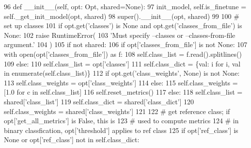\begin{DoxyCode}
96     \textcolor{keyword}{def }\_\_init\_\_(self, opt: Opt, shared=\textcolor{keywordtype}{None}):
97         init\_model, self.is\_finetune = self.\_get\_init\_model(opt, shared)
98         super().\_\_init\_\_(opt, shared)
99 
100         \textcolor{comment}{# set up classes}
101         \textcolor{keywordflow}{if} opt.get(\textcolor{stringliteral}{'classes'}) \textcolor{keywordflow}{is} \textcolor{keywordtype}{None} \textcolor{keywordflow}{and} opt.get(\textcolor{stringliteral}{'classes\_from\_file'}) \textcolor{keywordflow}{is} \textcolor{keywordtype}{None}:
102             \textcolor{keywordflow}{raise} RuntimeError(
103                 \textcolor{stringliteral}{'Must specify --classes or --classes-from-file argument.'}
104             )
105         \textcolor{keywordflow}{if} \textcolor{keywordflow}{not} shared:
106             \textcolor{keywordflow}{if} opt[\textcolor{stringliteral}{'classes\_from\_file'}] \textcolor{keywordflow}{is} \textcolor{keywordflow}{not} \textcolor{keywordtype}{None}:
107                 with open(opt[\textcolor{stringliteral}{'classes\_from\_file'}]) \textcolor{keyword}{as} f:
108                     self.class\_list = f.read().splitlines()
109             \textcolor{keywordflow}{else}:
110                 self.class\_list = opt[\textcolor{stringliteral}{'classes'}]
111             self.class\_dict = \{val: i \textcolor{keywordflow}{for} i, val \textcolor{keywordflow}{in} enumerate(self.class\_list)\}
112             \textcolor{keywordflow}{if} opt.get(\textcolor{stringliteral}{'class\_weights'}, \textcolor{keywordtype}{None}) \textcolor{keywordflow}{is} \textcolor{keywordflow}{not} \textcolor{keywordtype}{None}:
113                 self.class\_weights = opt[\textcolor{stringliteral}{'class\_weights'}]
114             \textcolor{keywordflow}{else}:
115                 self.class\_weights = [1.0 \textcolor{keywordflow}{for} c \textcolor{keywordflow}{in} self.class\_list]
116             self.reset\_metrics()
117         \textcolor{keywordflow}{else}:
118             self.class\_list = shared[\textcolor{stringliteral}{'class\_list'}]
119             self.class\_dict = shared[\textcolor{stringliteral}{'class\_dict'}]
120             self.class\_weights = shared[\textcolor{stringliteral}{'class\_weights'}]
121 
122         \textcolor{comment}{# get reference class; if opt['get\_all\_metrics'] is False, this is}
123         \textcolor{comment}{# used to compute metrics}
124         \textcolor{comment}{# in binary classfication, opt['threshold'] applies to ref class}
125         \textcolor{keywordflow}{if} opt[\textcolor{stringliteral}{'ref\_class'}] \textcolor{keywordflow}{is} \textcolor{keywordtype}{None} \textcolor{keywordflow}{or} opt[\textcolor{stringliteral}{'ref\_class'}] \textcolor{keywordflow}{not} \textcolor{keywordflow}{in} self.class\_dict:

\end{DoxyCode}
